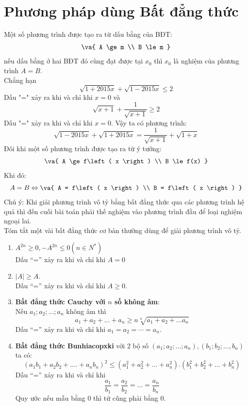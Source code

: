 \section{Phương pháp dùng Bất đẳng thức}
Một số phương trình được tạo ra từ dấu bằng của BĐT: 
$$\va{
 A \ge m \\ 
 B \le m }$$ 
nếu dấu bằng ở hai BĐT đó cùng đạt được tại $x_0$ thì $x_0$ là nghiệm của phương trình $A=B$.\\
Chẳng hạn
$$\sqrt {1 + 2015x} + \sqrt {1 - 2015x} \le 2$$ Dấu "=" xảy ra khi và chỉ khi $x=0$ và 
$$\sqrt {x + 1} + \dfrac{1}{{\sqrt {x + 1} }} \ge 2$$
Dấu "=" xảy ra khi và chỉ khi $x = 0$. Vậy ta có phương trình: 
$$\sqrt {1 - 2015x} + \sqrt {1 + 2015x} = \dfrac{1}{{\sqrt {x + 1} }} + \sqrt {1 + x} $$
Đôi khi một số phương trình được tạo ra từ ý tưởng:  $$\va{
 A \ge f\left( x \right) \\ 
 B \le f(x) }$$ 
 Khi đó:  
 $$A = B \Leftrightarrow \va{
 A = f\left( x \right) \\ 
 B = f\left( x \right) }$$
Chú ý: Khi giải phương trình vô tỷ bằng bất đẳng thức qua các phương trình hệ quả thì đến cuối bài toán phải thế nghiệm vào phương trình đầu để loại nghiệm ngoại lai. \\
 Tóm tắt một vài bất đẳng thức cơ bản thường dùng để giải phương trình vô tỷ.
\begin{enumerate}
\item ${ A}^{2n} \ge 0, - { A}^{2n} \le 0\left( {n \in { N}^* } \right)
$\\
 Dấu “=” xảy ra khi và chỉ khi $A = 0$
\item $
\left| { A} \right| \ge { A}
$.\\
 Dấu “=” xảy ra khi và chỉ khi $A \geq 0$.
\item \textbf{Bất đẳng thức Cauchy với $n$ số không âm}:\\
Nếu $a_1; a_2; ...; a_n$ không âm thì 
$$a_1 + a_2 + ... + a_n \ge n\sqrt[n]{a_1 + a_2 + ...a_n }$$
Dấu “=” xảy ra khi và chỉ khi $a_1 = a_2 = \cdots =a_n$.
\item \textbf{Bất đẳng thức Bunhiacopxki} với 2 bộ số $(a_1; a_2; ...; a_n), (b_1; b_2; ..., b_n)$ ta có:
$$\left( {a_1 b_1 + a_2 b_2 + ....+ a_n b_n } \right)^2 \le \left( {a_1^2 + a_2^2 + ... + a_n^2 } \right).\left( {b_1^2 + b_2^2 + ... + b_n^2 } \right) $$
Dấu “=” xảy ra khi và chỉ khi
$$ \dfrac{{a_1 }}{{b_1 }} = \dfrac{{a_2 }}{{b_2 }} = ... = \dfrac{{a_n }}{{b_n }}
$$
Quy ước nếu mẫu bằng $0$ thì tử cũng phải bằng $0$.
\end{enumerate}
